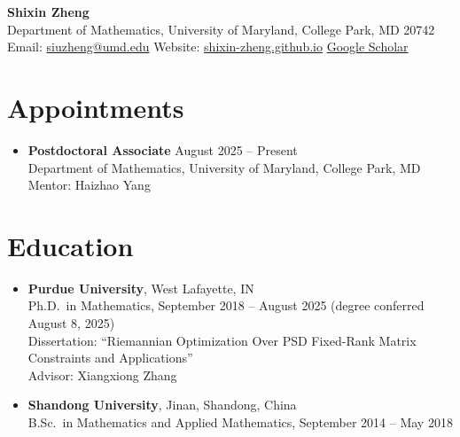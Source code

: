 \documentclass[11pt]{article}
\begin{document}
\begin{center}
{\LARGE \textbf{Shixin Zheng}}\\[4pt]
Department of Mathematics, University of Maryland, College Park, MD 20742\\
Email: \href{mailto:siuzheng@umd.edu}{siuzheng@umd.edu} \quad
Website: \href{https://shixin-zheng.github.io/}{shixin-zheng.github.io} \quad
\href{https://scholar.google.com/citations?user=SVxyZFkAAAAJ}{Google Scholar}
\end{center}

\section{Appointments}

\begin{itemize}[leftmargin=0pt, label={}, itemsep=4pt]
\item \textbf{Postdoctoral Associate} \hfill August 2025 -- Present\\
Department of Mathematics, University of Maryland, College Park, MD\\
Mentor: Haizhao Yang
\end{itemize}

\section{Education}

\begin{itemize}[leftmargin=0pt, label={}, itemsep=4pt]
\item \textbf{Purdue University}, West Lafayette, IN\\
Ph.D.\ in Mathematics, September 2018 -- August 2025 (degree conferred August 8, 2025)\\
Dissertation: ``Riemannian Optimization Over PSD Fixed-Rank Matrix Constraints and Applications''\\
Advisor: Xiangxiong Zhang

\item \textbf{Shandong University}, Jinan, Shandong, China\\
B.Sc.\ in Mathematics and Applied Mathematics, September 2014 -- May 2018
\end{itemize}
\end{document}
